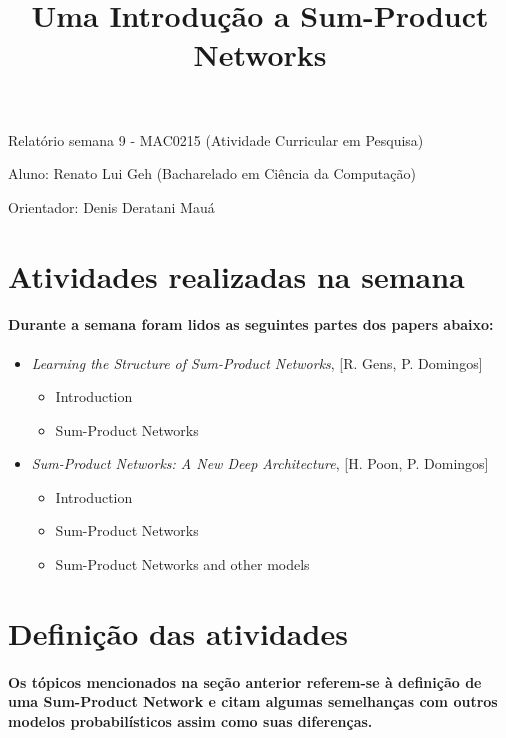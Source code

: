 \documentclass[a4paper,10pt]{article}
\title{\textbf{Uma Introdução a Sum-Product Networks}}
\theoremstyle{plain}
\begin{document}
\date{}
\author{}
\vspace*{-40pt}
{\let\newpage\relax\maketitle}

Relatório semana 9 - MAC0215 (Atividade Curricular em Pesquisa)

Aluno: Renato Lui Geh (Bacharelado em Ciência da Computação)

Orientador: Denis Deratani Mauá

\section{Atividades realizadas na semana}

\paragraph{
  Durante a semana foram lidos as seguintes partes dos papers abaixo:
}

\begin{itemize}
  \item \textit{Learning the Structure of Sum-Product Networks}, [R. Gens, P. Domingos]
    \cite{gens-domingos}
    \begin{itemize}
      \item Introduction
      \item Sum-Product Networks
    \end{itemize}
  \item \textit{Sum-Product Networks: A New Deep Architecture}, [H. Poon, P. Domingos]
    \cite{poon-domingos}
    \begin{itemize}
      \item Introduction
      \item Sum-Product Networks
      \item Sum-Product Networks and other models
    \end{itemize}
\end{itemize}

\section{Definição das atividades}

\paragraph{
  Os tópicos mencionados na seção anterior referem-se à definição de uma Sum-Product Network e
  citam algumas semelhanças com outros modelos probabilísticos assim como suas diferenças.
}
\end{document}
